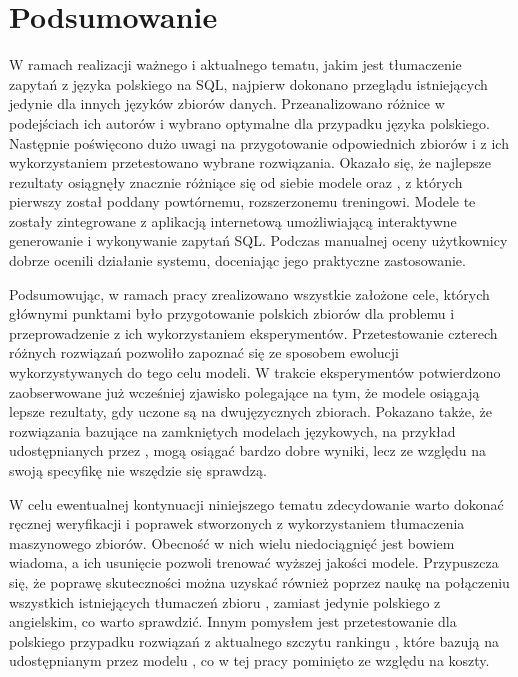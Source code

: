 \chapter{Podsumowanie}

W ramach realizacji ważnego i aktualnego tematu, jakim jest tłumaczenie zapytań z języka polskiego na SQL, najpierw dokonano przeglądu istniejących jedynie dla innych języków zbiorów danych. Przeanalizowano różnice w podejściach ich autorów i wybrano optymalne dla przypadku języka polskiego. Następnie poświęcono dużo uwagi na przygotowanie odpowiednich zbiorów i z ich wykorzystaniem przetestowano wybrane rozwiązania. Okazało się, że najlepsze rezultaty osiągnęły znacznie różniące się od siebie modele  oraz , z których pierwszy został poddany powtórnemu, rozszerzonemu treningowi. Modele te zostały zintegrowane z aplikacją internetową umożliwiającą interaktywne generowanie i wykonywanie zapytań SQL. Podczas manualnej oceny użytkownicy dobrze ocenili działanie systemu, doceniając jego praktyczne zastosowanie.

Podsumowując, w ramach pracy zrealizowano wszystkie założone cele, których głównymi punktami było przygotowanie polskich zbiorów dla problemu  i przeprowadzenie z ich wykorzystaniem eksperymentów. Przetestowanie czterech różnych rozwiązań pozwoliło zapoznać się ze sposobem ewolucji wykorzystywanych do tego celu modeli. W trakcie eksperymentów potwierdzono zaobserwowane już wcześniej zjawisko polegające na tym, że modele osiągają lepsze rezultaty, gdy uczone są na dwujęzycznych zbiorach. Pokazano także, że rozwiązania bazujące na zamkniętych modelach językowych, na przykład udostępnianych przez , mogą osiągać bardzo dobre wyniki, lecz ze względu na swoją specyfikę nie wszędzie się sprawdzą.

W celu ewentualnej kontynuacji niniejszego tematu zdecydowanie warto dokonać ręcznej weryfikacji i poprawek stworzonych z wykorzystaniem tłumaczenia maszynowego zbiorów. Obecność w nich wielu niedociągnięć jest bowiem wiadoma, a ich usunięcie pozwoli trenować wyższej jakości modele. Przypuszcza się, że poprawę skuteczności można uzyskać również poprzez naukę na połączeniu wszystkich istniejących tłumaczeń zbioru , zamiast jedynie polskiego z angielskim, co warto sprawdzić. Innym pomysłem jest przetestowanie dla polskiego przypadku rozwiązań z aktualnego szczytu rankingu , które bazują na udostępnianym przez  modelu , co w tej pracy pominięto ze względu na koszty.
